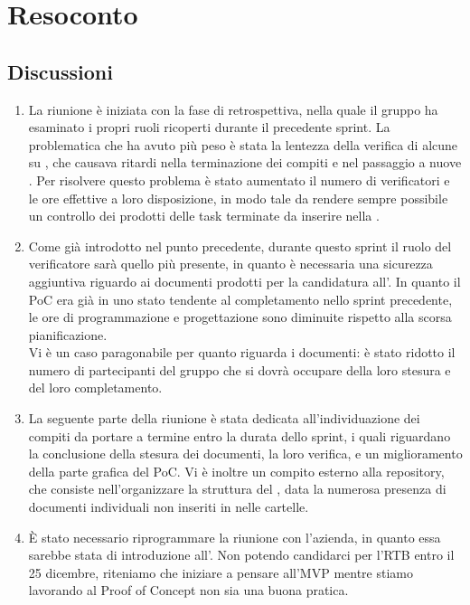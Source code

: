 \section{Resoconto} \label{sec:resoconto}
\subsection{Discussioni} \label{subsec:resdiscussione}
\begin{enumerate}
    \item La riunione è iniziata con la fase di retrospettiva, nella quale il gruppo ha esaminato i propri ruoli ricoperti durante il precedente sprint. La problematica che ha avuto più peso è stata la lentezza della verifica di alcune  su , che causava ritardi nella terminazione dei compiti e nel passaggio a nuove . Per risolvere questo problema è stato aumentato il numero di verificatori e le ore effettive a loro disposizione, in modo tale da rendere sempre possibile un controllo dei prodotti delle task terminate da inserire nella .
    \item Come già introdotto nel punto precedente, durante questo sprint il ruolo del verificatore sarà quello più presente, in quanto è necessaria una sicurezza aggiuntiva  riguardo ai documenti prodotti per la candidatura all'. In quanto il PoC era già in uno stato tendente al completamento nello sprint precedente, le ore di programmazione e progettazione sono diminuite rispetto alla scorsa pianificazione.\\
    Vi è un caso paragonabile per quanto riguarda i documenti: è stato ridotto il numero di partecipanti del gruppo che si dovrà occupare della loro stesura e del loro completamento.  
    \item La seguente parte della riunione è stata dedicata all'individuazione dei compiti da portare a termine entro la durata dello sprint, i quali riguardano la conclusione della stesura dei documenti, la loro verifica, e un miglioramento della parte grafica del PoC. Vi è inoltre un compito esterno alla repository, che consiste nell'organizzare la struttura del , data la numerosa presenza di documenti individuali non inseriti in nelle cartelle.
    \item È stato necessario riprogrammare la riunione con l'azienda, in quanto essa sarebbe stata di introduzione all'. Non potendo candidarci per l'RTB entro il 25 dicembre, riteniamo che iniziare a pensare all'MVP mentre stiamo lavorando al Proof of Concept non sia una buona pratica.
\end{enumerate}

